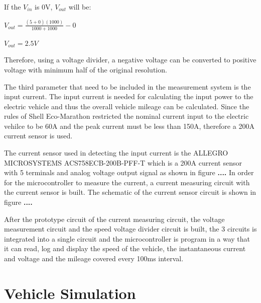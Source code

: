 If the \textit{$V_{in}$} is 0V, \textit{$V_{out}$} will be:

\centerline{$V_{out} = \frac{(5+0)(1000)}{1000+1000} - 0$}
\centerline{$V_{out} = 2.5V$}

Therefore, using a voltage divider, a negative voltage can be converted to positive voltage with minimum half of the original resolution.

The third parameter that need to be included in the measurement system is the input current. The input current is needed for calculating the input power to the electric vehicle and thus the overall vehicle mileage can be calculated. Since the rules of Shell Eco-Marathon restricted the nominal current input to the electric vehilce to be 60A and the peak current must be less than 150A, therefore a 200A current sensor is used.

The current sensor used in detecting the input current is the ALLEGRO MICROSYSTEMS ACS758ECB-200B-PFF-T which is a 200A current sensor with 5 terminals and analog voltage output signal as shown in figure \textbf{....} In order for the microcontroller to measure the current, a current measuring circuit with the current sensor is built. The schematic of the current sensor circuit is shown in figure \textbf{....}

After the prototype circuit of the current measuring circuit, the voltage measurement circuit and the speed voltage divider circuit is built, the 3 circuits is integrated into a single circuit and the microcontroller is program in a way that it can read, log and display the speed of the vehicle, the instantaneous current and voltage and the mileage covered every 100ms interval.

\section{Vehicle Simulation}

